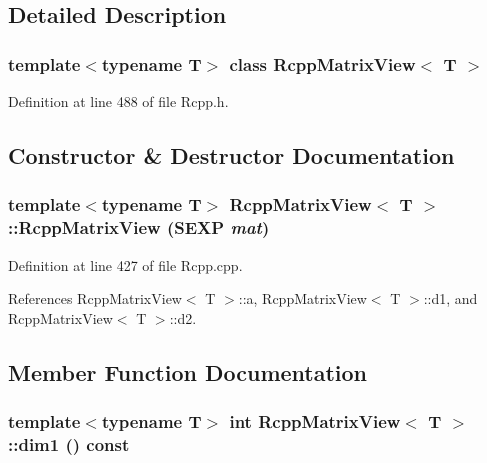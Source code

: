 \subsection{Detailed Description}
\subsubsection*{template$<$typename T$>$ class RcppMatrixView$<$ T $>$}



Definition at line 488 of file Rcpp.h.

\subsection{Constructor \& Destructor Documentation}
\hypertarget{classRcppMatrixView_c3489c6a24c2975f3ea7103ada50e328}{
\subsubsection[RcppMatrixView]{\setlength{\rightskip}{0pt plus 5cm}template$<$typename T$>$ {\bf RcppMatrixView}$<$ T $>$::{\bf RcppMatrixView} (SEXP {\em mat})}}
\label{classRcppMatrixView_c3489c6a24c2975f3ea7103ada50e328}




Definition at line 427 of file Rcpp.cpp.

References RcppMatrixView$<$ T $>$::a, RcppMatrixView$<$ T $>$::d1, and RcppMatrixView$<$ T $>$::d2.

\subsection{Member Function Documentation}
\hypertarget{classRcppMatrixView_72d1d7fcdc4b1cc6dd877b1df2f9f5e6}{
\subsubsection[dim1]{\setlength{\rightskip}{0pt plus 5cm}template$<$typename T$>$ int {\bf RcppMatrixView}$<$ T $>$::dim1 () const}}
\label{classRcppMatrixView_72d1d7fcdc4b1cc6dd877b1df2f9f5e6}




